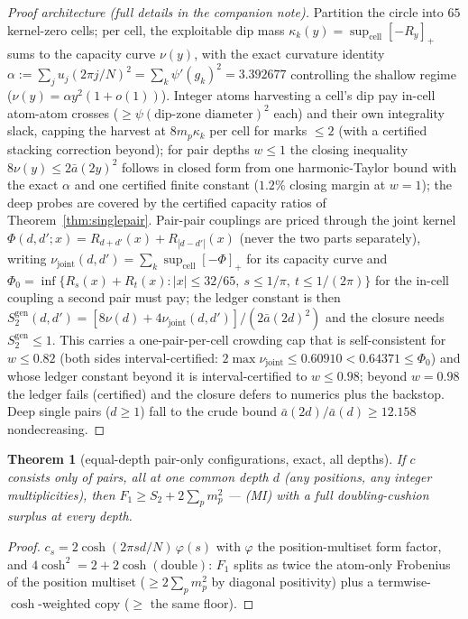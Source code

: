 \documentclass[11pt]{article}
\theoremstyle{plain}
\newtheorem{theorem}{Theorem}[section]
\theoremstyle{definition}
\theoremstyle{remark}
\newcommand{\Sgen}{S^{\mathrm{gen}}_{2}}
\begin{document}
\begin{proof}[Proof architecture (full details in the companion note)]
\renewcommand{\qedsymbol}{QED (architecture)}
Partition the circle into $65$ kernel-zero cells; per cell, the exploitable dip
mass $\kappa_k(y) = \sup_{\mathrm{cell}} [-R_y]_+$ sums to the capacity curve
$\nu(y)$, with the exact curvature identity
$\alpha := \sum_j u_j (2\pi j/N)^2 = \sum_k \psi'(g_k)^2 = 3.392677$ controlling
the shallow regime ($\nu(y) = \alpha y^2 (1 + o(1))$). Integer atoms harvesting a
cell's dip pay in-cell atom-atom crosses ($\ge \psi(\text{dip-zone diameter})^2$
each) and their own integrality slack, capping the harvest at
$8 m_p \kappa_k$ per cell for marks $\le 2$ (with a certified stacking correction
beyond); for pair depths $w \le 1$ the closing inequality
$8\nu(y) \le 2\bar{a}(2y)^2$ follows in closed form from one harmonic-Taylor
bound with the exact $\alpha$ and one certified finite constant ($1.2\%$ closing
margin at $w = 1$); the deep probes are covered by the certified capacity ratios
of Theorem~\ref{thm:singlepair}. Pair-pair couplings are priced through the
joint kernel
$\Phi(d, d'; x) = R_{d+d'}(x) + R_{|d-d'|}(x)$ (never the two parts separately),
writing $\nu_{\mathrm{joint}}(d, d') = \sum_k \sup_{\mathrm{cell}} [-\Phi]_+$ for
its capacity curve and
$\Phi_0 = \inf\{ R_s(x) + R_t(x) : |x| \le 32/65,\ s \le 1/\pi,\ t \le 1/(2\pi) \}$
for the in-cell coupling a second pair must pay; the ledger constant is then
$\Sgen(d, d')
 = [8\nu(d) + 4\nu_{\mathrm{joint}}(d, d')] / (2\bar{a}(2d)^2)$ and the closure
needs $\Sgen \le 1$. This carries a
one-pair-per-cell crowding cap that is self-consistent for $w \le 0.82$ (both
sides interval-certified:
$2 \max \nu_{\mathrm{joint}} \le 0.60910 < 0.64371 \le \Phi_0$) and whose
ledger constant beyond it is interval-certified to
$w \le 0.98$; beyond $w = 0.98$ the ledger fails (certified) and the closure
defers to numerics plus the backstop. Deep single pairs ($d \ge 1$) fall to the
crude bound $\bar{a}(2d)/\bar{a}(d) \ge 12.158$ nondecreasing.
\end{proof}

\begin{theorem}[equal-depth pair-only configurations, exact, all depths]
\label{thm:equaldepth}
If $c$ consists only of pairs, all at one common depth $d$ (any positions, any
integer multiplicities), then $F_1 \ge S_2 + 2 \sum_p m_p^2$ --- (MI) with a full
doubling-cushion surplus at every depth.
\end{theorem}

\begin{proof}
$c_s = 2\cosh(2\pi s d/N)\,\varphi(s)$ with $\varphi$ the position-multiset form
factor, and $4\cosh^2 = 2 + 2\cosh(\text{double})$: $F_1$ splits as twice the
atom-only Frobenius of the position multiset ($\ge 2\sum_p m_p^2$ by diagonal
positivity) plus a termwise-$\cosh$-weighted copy ($\ge$ the same floor).
\end{proof}
\end{document}
